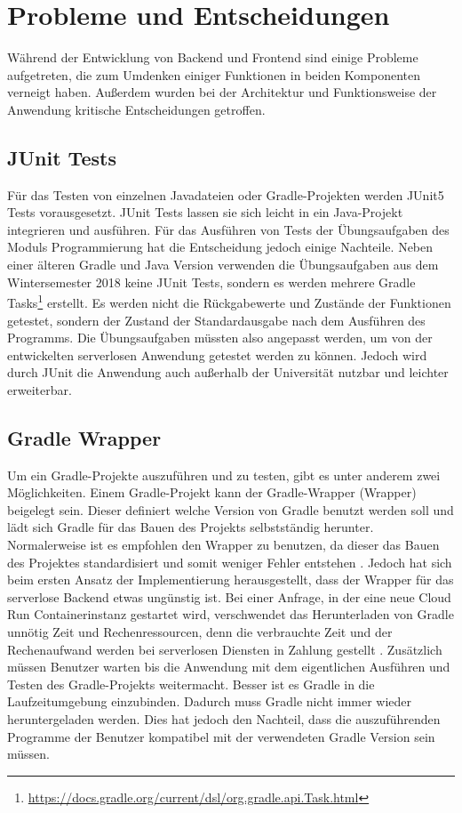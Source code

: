 \chapter{Probleme und Entscheidungen}
Während der Entwicklung von Backend und Frontend sind
einige Probleme aufgetreten, die zum Umdenken einiger Funktionen
in beiden Komponenten verneigt haben. Außerdem wurden bei der Architektur
und Funktionsweise der Anwendung kritische Entscheidungen getroffen.

\section{JUnit Tests}
Für das Testen von einzelnen Javadateien oder Gradle-Projekten werden
JUnit5 Tests vorausgesetzt. JUnit Tests lassen sie sich leicht in ein Java-Projekt integrieren und 
ausführen. Für das Ausführen von Tests der Übungsaufgaben des Moduls Programmierung
hat die Entscheidung jedoch einige Nachteile. Neben einer älteren Gradle und Java Version
verwenden die Übungsaufgaben aus dem Wintersemester 2018 keine JUnit Tests, sondern es werden
mehrere Gradle Tasks\footnote{\url{https://docs.gradle.org/current/dsl/org.gradle.api.Task.html}}
erstellt. Es werden nicht die Rückgabewerte und Zustände der Funktionen
getestet, sondern der Zustand der Standardausgabe nach dem Ausführen des Programms.
Die Übungsaufgaben müssten also angepasst werden, um von der entwickelten serverlosen 
Anwendung getestet werden zu können. Jedoch wird durch JUnit die Anwendung
auch außerhalb der Universität nutzbar und leichter erweiterbar.

\section{Gradle Wrapper}
Um ein Gradle-Projekte auszuführen und
zu testen, gibt es unter anderem zwei Möglichkeiten.
Einem Gradle-Projekt kann der Gradle-Wrapper (Wrapper)
beigelegt sein. Dieser definiert welche Version von Gradle benutzt
werden soll und lädt sich Gradle für das Bauen des Projekts selbstständig herunter.
Normalerweise ist es empfohlen den Wrapper zu benutzen,
da dieser das Bauen des Projektes standardisiert und
somit weniger Fehler entstehen \cite{GradleWrapper}.
Jedoch hat sich beim ersten Ansatz der Implementierung herausgestellt, dass der
Wrapper für das serverlose Backend etwas ungünstig ist.
Bei einer Anfrage, in der eine neue Cloud Run Containerinstanz
gestartet wird, verschwendet das Herunterladen von Gradle
unnötig Zeit und Rechenressourcen, denn die verbrauchte Zeit und der Rechenaufwand
werden bei serverlosen Diensten in Zahlung gestellt \cite{ServerlessTrends}.
Zusätzlich müssen Benutzer warten bis die Anwendung mit dem eigentlichen
Ausführen und Testen des Gradle-Projekts weitermacht.
Besser ist es Gradle in die Laufzeitumgebung einzubinden.
Dadurch muss Gradle nicht immer wieder heruntergeladen werden. Dies hat jedoch
den Nachteil, dass die auszuführenden Programme der Benutzer
kompatibel mit der verwendeten Gradle Version sein müssen.

